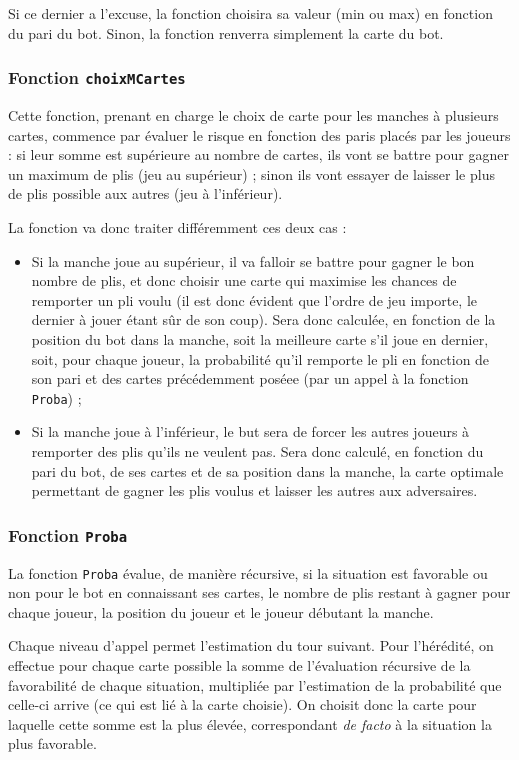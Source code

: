          Si ce dernier a l'excuse, la fonction choisira sa valeur (min ou max) en fonction du pari du bot.
         Sinon, la fonction renverra simplement la carte du bot.
         
      \subsubsection{Fonction \texttt{choixMCartes}}
         Cette fonction, prenant en charge le choix de carte pour les manches à plusieurs cartes, commence par évaluer le risque en fonction des paris placés par les joueurs : si leur somme est supérieure au nombre de cartes, ils vont se battre pour gagner un maximum de plis (jeu au supérieur) ;
         sinon ils vont essayer de laisser le plus de plis possible aux autres (jeu à l'inférieur).

         La fonction va donc traiter différemment ces deux cas :
         \begin{itemize}
            \item Si la manche joue au supérieur, il va falloir se battre pour gagner le bon nombre de plis, et donc choisir une carte qui maximise les chances de remporter un pli voulu (il est donc évident que l'ordre de jeu importe, le dernier à jouer étant sûr de son coup).
            Sera donc calculée, en fonction de la position du bot dans la manche, soit la meilleure carte s'il joue en dernier, soit, pour chaque joueur, la probabilité qu'il remporte le pli en fonction de son pari et des cartes précédemment poséee (par un appel à la fonction \texttt{Proba}) ;
            \item Si la manche joue à l'inférieur, le but sera de forcer les autres joueurs à remporter des plis qu'ils ne veulent pas.
            Sera donc calculé, en fonction du pari du bot, de ses cartes et de sa position dans la manche, la carte optimale permettant de gagner les plis voulus et laisser les autres aux adversaires.
         \end{itemize}
      \subsubsection{Fonction \texttt{Proba}}
         La fonction \texttt{Proba} évalue, de manière récursive, si la situation est favorable ou non pour le bot en connaissant ses cartes, le nombre de plis restant à gagner pour chaque joueur, la position du joueur et le joueur débutant la manche.

         Chaque niveau d'appel permet l'estimation du tour suivant.
         Pour l'hérédité, on effectue pour chaque carte possible la somme de l'évaluation récursive de la favorabilité de chaque situation, multipliée par l'estimation de la probabilité que celle-ci arrive (ce qui est lié à la carte choisie).
         On choisit donc la carte pour laquelle cette somme est la plus élevée, correspondant \textit{de facto} à la situation la plus favorable.

